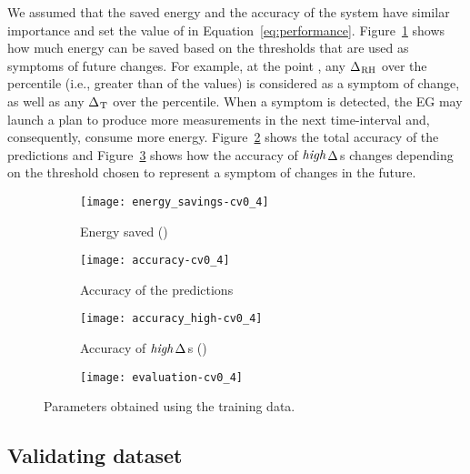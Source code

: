 \documentclass{llncs}
\newcommand{\ourDelta}[2][]{\ensuremath{\Delta\textsuperscript{\text{#1}}
\textsubscript{\text{#2}}}}
\newcommand{\high}[1][ ]{\ensuremath{\text{\emph{high}}#1}}
\newcommand{\highDelta}[2][]{\high{\ourDelta[#1]{#2}}}
\begin{document}
We assumed that the saved energy and the accuracy of the system have similar 
importance and set the value of  in Equation~\ref{eq:performance}.
Figure~\ref{fig:performance-energy-consumption} shows how much energy can be 
saved based on the thresholds that are used as symptoms of future changes. For 
example, at the point , any \ourDelta{RH} over the  
percentile (i.e., greater than  of the values) is considered as a symptom 
of change, as well as any \ourDelta{T} over the  percentile. When 
a symptom is detected, the EG may launch a plan to produce more measurements in 
the next time-interval and, consequently, consume more energy.
Figure~\ref{fig:performance-accuracy} shows the total accuracy of the 
predictions and Figure~\ref{fig:performance-high-accuracy} shows how the 
accuracy of \highDelta{}s changes depending on the threshold chosen to represent 
a symptom of changes in the future.

\begin{figure}[h]
	\centering
	\begin{subfigure}[t]{0.21\textwidth}
		\centering
		
\texttt{[image: energy\_savings-cv0\_4]}
		\caption{Energy saved ()}
		\label{fig:performance-energy-consumption}
	\end{subfigure}\qquad
	\begin{subfigure}[t]{0.21\textwidth}
		\centering
\texttt{[image: accuracy-cv0\_4]}
		\caption{Accuracy of the predictions}
		\label{fig:performance-accuracy}
	\end{subfigure}\qquad
	\begin{subfigure}[t]{0.21\textwidth}
		\centering
		
\texttt{[image: accuracy\_high-cv0\_4]}
		\caption{Accuracy of \highDelta{}s ()}
		\label{fig:performance-high-accuracy}
	\end{subfigure}\qquad
	\begin{subfigure}[t]{0.21\textwidth}
		\centering
		
\texttt{[image: evaluation-cv0\_4]}
		\caption{}
		\label{fig:performance-score}
	\end{subfigure}\caption{Parameters obtained using the training data.}
	\label{fig:performance-process}

\end{figure}


\subsection{Validating dataset}
\end{document}
